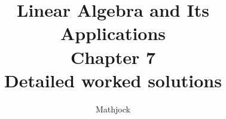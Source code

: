 
\title{\textbf{Linear Algebra and Its Applications}\\[0.3em]Chapter 7\\[0.3em]\large Detailed worked solutions}
\author{Mathjock}
\date{}

\maketitle
\bookinfo
\tableofcontents
\clearpage
\renewcommand{\thesection}{7.\arabic{section}}
\renewcommand{\theHsection}{7.\arabic{section}}
\setcounter{section}{0}

\clearpage
\renewcommand{\thesection}{7.\arabic{section}}
\renewcommand{\theHsection}{7.\arabic{section}}
\setcounter{section}{1}

\clearpage
\renewcommand{\thesection}{7.\arabic{section}}
\renewcommand{\theHsection}{7.\arabic{section}}
\setcounter{section}{2}

\clearpage
\renewcommand{\thesection}{7.\arabic{section}}
\renewcommand{\theHsection}{7.\arabic{section}}
\setcounter{section}{3}

\clearpage
\renewcommand{\thesection}{7.\arabic{section}}
\renewcommand{\theHsection}{7.\arabic{section}}
\setcounter{section}{4}

\clearpage
\renewcommand{\thesection}{7.S}
\renewcommand{\theHsection}{7.S}
\setcounter{section}{0}


